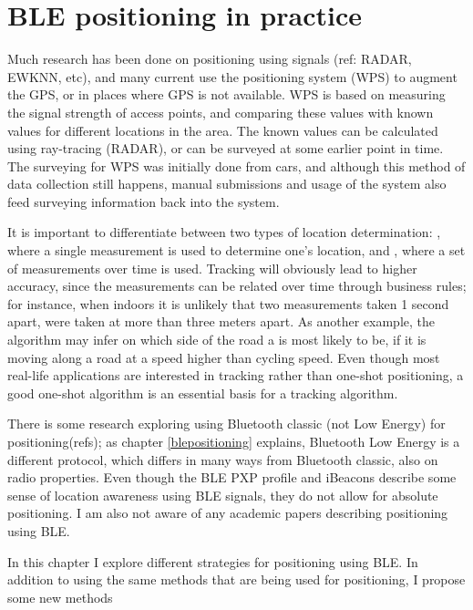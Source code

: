 \chapter{BLE positioning in practice}
\label{chap:architecture}


Much research has been done on positioning using \wifi signals (ref: RADAR, EWKNN, etc), and many current \devices use the \wifi positioning system (WPS) to augment the GPS, or in places where GPS is not available.
WPS is based on measuring the signal strength of access points, and comparing these values with known values for different locations in the area.
The known values can be calculated using ray-tracing (RADAR), or can be surveyed at some earlier point in time.
The surveying for WPS was initially done from cars, and although this method of data collection still happens, manual submissions and usage of the system also feed surveying information back into the system.

It is important to differentiate between two types of location determination: , where a single measurement is used to determine one's location, and , where a set of measurements over time is used.
Tracking will obviously lead to higher accuracy, since the measurements can be related over time through business rules; for instance, when indoors it is unlikely that two measurements taken 1 second apart, were taken at more than three meters apart.
As another example, the algorithm may infer on which side of the road a \device is most likely to be, if it is moving along a road at a speed higher than cycling speed.
Even though most real-life applications are interested in tracking rather than one-shot positioning, a good one-shot algorithm is an essential basis for a tracking algorithm.

There is some research exploring using Bluetooth classic (not Low Energy) for positioning(refs); as chapter \ref{blepositioning} explains, Bluetooth Low Energy is a different protocol, which differs in many ways from Bluetooth classic, also on radio properties.
Even though the BLE PXP profile and iBeacons describe some sense of location awareness using BLE signals, they do not allow for absolute positioning.
I am also not aware of any academic papers describing positioning using BLE.

In this chapter I explore different strategies for positioning using BLE.
In addition to using the same methods that are being used for \wifi positioning, I propose some new methods 

